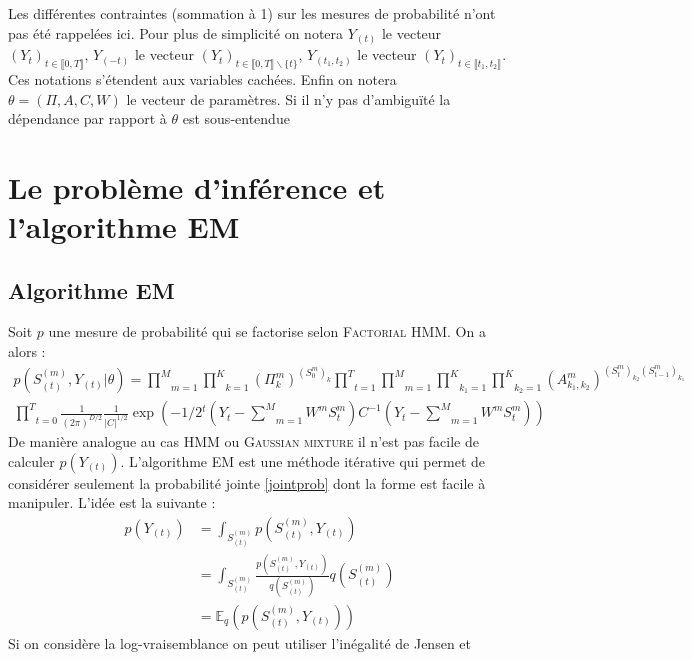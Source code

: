 \documentclass[10pt,a4paper]{article}
\newcommand{\hmm}{\textsc{HMM}}
\newcommand{\fhmm}{\textsc{Factorial HMM}}
\newcommand{\EM}{\textsc{EM}}
\begin{document}
Les différentes contraintes (sommation à 1) sur les mesures de probabilité 
n'ont pas été rappelées ici. Pour plus de simplicité on notera $Y_{(t)}$ le 
vecteur $(Y_t)_{t \in \llbracket 0,T \rrbracket}$, $Y_{(-t)}$ le vecteur 
$(Y_{t})_{t \in \llbracket 0,T \rrbracket\backslash \lbrace t \rbrace}$, 
$Y_{(t_1,t_2)}$ le vecteur $(Y_t)_{t \in \llbracket t_1,t_2 \rrbracket}$. Ces 
notations s'étendent aux variables cachées. Enfin on notera $\theta=(\Pi, 
A,C,W)$ le vecteur de paramètres. Si il n'y pas d'ambiguïté la dépendance 
par rapport à $\theta$ est sous-entendue
\section{Le problème d'inférence et l'algorithme EM}
\subsection{Algorithme EM}
Soit $p$ une mesure de probabilité qui se factorise selon \fhmm. On a alors :
\begin{multline}
p(S_{(t)}^{(m)},Y_{(t)} \vert 
\theta)=\underset{m=1}{\overset{M}{\prod}}\underset{k=1}{\overset{K}{\prod}}
(\Pi_k^m)^{(S_0^m)_k}\underset{t=1}{\overset{T}{\prod}}\underset{m=1}{\overset{M
}{\prod}}\underset{k_1=1}{\overset{K}{\prod}}\underset{k_2=1}{\overset{K}{\prod}
}(A_{k_1,k_2}^m)^{(S_t^m)_{k_2}(S_{t-1}^m)_{k_1}}\\ 
\underset{t=0}{\overset{T}{\prod}}\frac{1}{(2\pi)^{D/2}}\frac{1}{\vert C  
\vert^{1/2}}\exp\left(-1/2 {}^t\left(Y_t- \underset{m=1}{\overset{M}{\sum}}W^m 
S_t^m \right)C^{-1} \left(Y_t- \underset{m=1}{\overset{M}{\sum}}W^m S_t^m 
\right)\right) \label{jointprob}
\end{multline}
De manière analogue au cas \hmm{} ou \textsc{Gaussian mixture} il n'est pas 
facile de calculer $p(Y_{(t)})$. L'algorithme \EM{} est une méthode itérative 
qui 
permet de considérer seulement la probabilité jointe \ref{jointprob} dont la 
forme est facile à manipuler. L'idée est la suivante :
\begin{equation}
\begin{aligned}
p(Y_{(t)})&=\int_{S_{(t)}^{(m)}}p(S_{(t)}^{(m)},Y_{(t)}) \\
&=\int_{S_{(t)}^{(m)}}\frac{p(S_{(t)}^{(m)},Y_{(t)})}{q(S_{(t)}^{(m)})}q(S_{(t)}
^{(m)}) \\
&=\mathbb{E}_q\left(p(S_{(t)}^{(m)},Y_{(t)}) \right)
\end{aligned}
\end{equation}
Si on considère la log-vraisemblance on peut utiliser l'inégalité de Jensen et 
\end{document}
